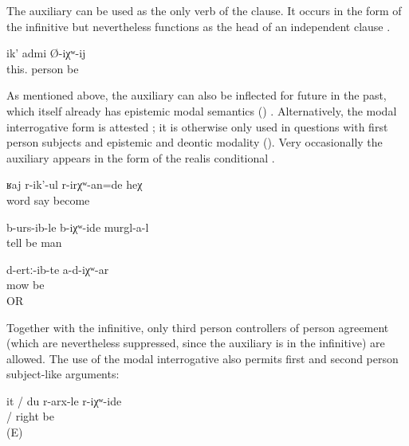 The auxiliary can be used as the only verb of the clause. It occurs in the form of the infinitive but nevertheless functions as the head of an independent clause .
%
\begin{exe}
	\ex	\label{ex:This is probably a man.}
	\gll	ik'	admi	Ø-iχʷ-ij\\
		this.	person	be\\
	\glt	{}
\end{exe}

As mentioned above, the auxiliary can also be inflected for future in the past, which itself already has epistemic modal semantics () . Alternatively, the modal interrogative form is attested ; it is otherwise only used in questions with first person subjects and epistemic and deontic modality (). Very occasionally the auxiliary appears in the form of the realis conditional .
%
\begin{exe}
	\ex	\label{ex:‎She must have been scolding / probably she was scolding}
	\gll	ʁaj	r-ik'-ul	r-irχʷ-an=de	heχ\\
		word	say	become	\\
	\glt	{}

	\ex	\label{ex:‎Probably the men had already told it}
	\gll	b-urs-ib-le	b-iχʷ-ide	murgl-a-l\\
		tell	be	man	\\
	\glt	{}

	\ex	\label{ex:‎‎This is probably mowed (grass).}
	\gll	d-ertː-ib-te	a-d-iχʷ-ar\\
		mow 	be\\
	\glt	{} OR 
\end{exe}

Together with the infinitive, only third person controllers of person agreement (which are nevertheless suppressed, since the auxiliary is in the infinitive) are allowed. The use of the modal interrogative also permits first and second person subject-like arguments:
%
\begin{exe}
	\ex	\label{ex:She / I was probably right}
	\gll	it	/	du	r-arx-le	r-iχʷ-ide\\
			/		right	be\\
	\glt	{} (E)
\end{exe}

